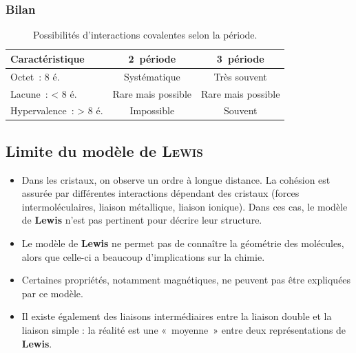 \documentclass[../../main/main.tex]{subfiles}
\begin{document}
\subsubsection{Bilan}

\begin{table}[H]
	\centering
	\caption{Possibilités d'interactions covalentes selon la période.}
	\label{tab:oclachy}
	\begin{tabular}{lcc}
		\toprule
		Caractéristique       &
		2\ieme\ période       &
		3\ieme\ période
		\\\midrule
		Octet~: 8 é.          & Systématique       & Très souvent
		\\
		Lacune~: < 8 é.       & Rare mais possible & Rare mais possible
		\\
		Hypervalence~: > 8 é. & Impossible         & Souvent
		\\\bottomrule
	\end{tabular}
\end{table}

\subsection{Limite du modèle de \textsc{Lewis}}
\begin{itemize}
	\item Dans les cristaux, on observe un ordre à longue distance. La cohésion
	      est assurée par différentes interactions dépendant des cristaux (forces
	      intermoléculaires, liaison métallique, liaison ionique). Dans ces cas,
	      le modèle de \textbf{Lewis} n'est pas pertinent pour décrire leur
	      structure.
	\item Le modèle de \textbf{Lewis} ne permet pas de connaître la géométrie
	      des molécules, alors que celle-ci a beaucoup d'implications sur la
	      chimie.
	\item Certaines propriétés, notamment magnétiques, ne peuvent pas être
	      expliquées par ce modèle.
	\item Il existe également des liaisons intermédiaires entre la liaison
	      double et la liaison simple : la réalité est une «~moyenne~» entre deux
	      représentations de \textbf{Lewis}.
\end{itemize}
\end{document}
